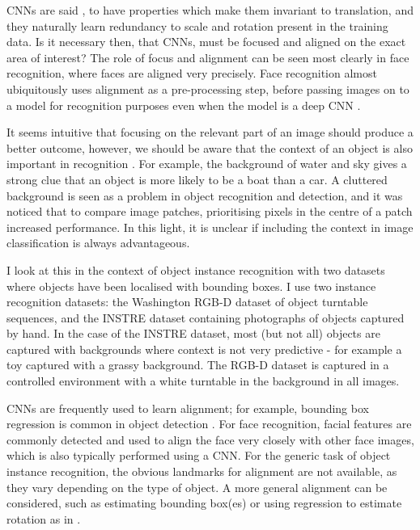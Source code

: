 \gls{CNN}s are said \cite{Krizhevsky2012}, to have properties which make them invariant to translation, and they naturally learn redundancy to scale and rotation present in the training data. Is it necessary then, that \gls{CNN}s, must be focused and aligned on the exact area of interest? The role of focus and alignment can be seen most clearly in face recognition, where faces are aligned very precisely. Face recognition almost ubiquitously uses alignment as a pre-processing step, before passing images on to a model for recognition purposes even when the model is a deep CNN \cite{Taigman2014}.

It seems intuitive that focusing on the relevant part of an image should produce a better outcome, however, we should be aware that the context of an object is also important in recognition \cite{Oliva2007}. For example, the background of water and sky gives a strong clue that an object is more likely to be a boat than a car. A cluttered background is seen as a problem in object recognition and detection, and it was noticed that to compare image patches, prioritising pixels in the centre of a patch \cite{Zagoruyko2015} increased performance. In this light, it is unclear if including the context in image classification is always advantageous. 

I look at this in the context of object instance recognition with two datasets where objects have been localised with bounding boxes. I use two instance recognition datasets: the Washington RGB-D dataset \cite{Lai2011} of object turntable sequences, and the INSTRE dataset \cite{Wang2015} containing photographs of objects captured by hand. In the case of the INSTRE dataset, most (but not all) objects are captured with backgrounds where context is not very predictive - for example a toy captured with a grassy background. The RGB-D dataset is captured in a controlled environment with a white turntable in the background in all images.

\gls{CNN}s are frequently used to learn alignment; for example, bounding box regression is common in object detection \cite{Sermanet2013}. For face recognition, facial features are commonly detected and used to align the face very closely with other face images, which is also typically performed using a CNN. For the generic task of object instance recognition, the obvious landmarks for alignment are not available, as they vary depending on the type of object. A more general alignment can be considered, such as estimating bounding box(es) or using regression to estimate rotation as in \cite {Fischer2015}. 

